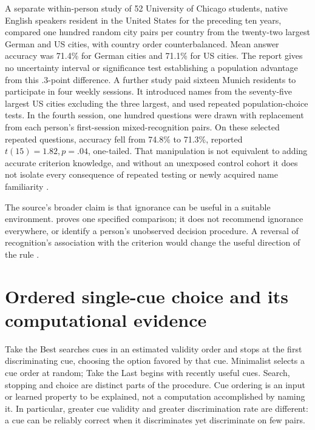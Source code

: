A separate within-person study of 52 University of Chicago students,
native English speakers resident in the United States for the preceding
ten years, compared one hundred
random city pairs per country from the twenty-two largest German
and US cities, with country order counterbalanced. Mean answer
accuracy was 71.4\% for German cities and 71.1\% for US cities.
The report gives no uncertainty interval or significance test
establishing a population advantage from this .3-point difference.
A further study paid sixteen Munich residents to participate in four
weekly sessions. It introduced names from the seventy-five largest US
cities excluding the three largest, and used repeated population-choice
tests. In the fourth session, one hundred questions were drawn with
replacement from each person's first-session mixed-recognition pairs.
On these selected repeated questions, accuracy fell from 74.8\% to 71.3\%,
reported \(t(15)=1.82,p=.04\), one-tailed. That manipulation
is not equivalent to adding accurate criterion knowledge, and without
an unexposed control cohort it does not isolate every consequence of
repeated testing or newly acquired name familiarity
\cite[pp.~84--85]{GoldsteinGigerenzer2002Recognition}.

The source's broader claim is that ignorance can be useful in a
suitable environment.  proves
one specified comparison; it does not recommend ignorance everywhere,
or identify a person's unobserved decision procedure. A reversal of
recognition's association with the criterion would change the useful
direction of the rule
\cite[pp.~164,167--168]{FiedlerPragerMcCaughey2021Heuristics}.

\section{Ordered single-cue choice and its computational evidence}
\label{sec:p19-r24-ttb}

Take the Best searches cues in an estimated validity order and stops
at the first discriminating cue, choosing the option favored by that
cue. Minimalist selects a cue order at random; Take the Last begins
with recently useful cues. Search, stopping and choice are distinct
parts of the procedure. Cue ordering is an input or learned property
to be explained, not a computation accomplished by naming it.
In particular, greater cue validity and greater discrimination rate
are different: a cue can be reliably correct when it discriminates
yet discriminate on few pairs.

